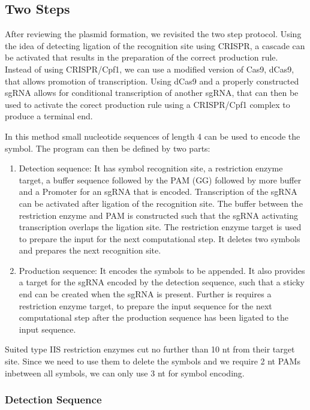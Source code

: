 \documentclass[
11pt, %
a4paper, %
oneside, %
headinclude,footinclude, %
BCOR5mm, %
]{scrartcl}
\begin{document}
\subsection{Two Steps}

After reviewing the plasmid formation, we revisited the two step protocol. Using
the idea of detecting ligation of the recognition site using CRISPR, a cascade
can be activated that results in the preparation of the correct production rule.
Instead of using CRISPR/Cpf1, we can use a modified version of Cas9, dCas9, that
allows promotion of transcription. Using dCas9 and a properly constructed sgRNA
allows for conditional transcription of another sgRNA, that can then be used to
activate the corect production rule using a CRISPR/Cpf1 complex to produce a
terminal end.

In this method small nucleotide sequences of length 4 can be used to encode the
symbol. The program can then be defined by two parts:
\begin{enumerate}
  \item Detection sequence: It has symbol recognition site, a restriction enzyme
    target, a buffer sequence followed by the PAM (GG) followed by more buffer
    and a Promoter for an sgRNA that is encoded. Transcription of the sgRNA can
    be activated after ligation of the recognition site. The buffer between the
    restriction enzyme and PAM is constructed such that the sgRNA activating
    transcription overlaps the ligation site. The restriction enzyme target is
    used to prepare the input for the next computational step. It deletes two
    symbols and prepares the next recognition site.
  \item Production sequence: It encodes the symbols to be appended. It also
    provides a target for the sgRNA encoded by the detection sequence, such that
    a sticky end can be created when the sgRNA is present. Further is requires a
    restriction enzyme target, to prepare the input sequence for the next
    computational step after the production sequence has been ligated to the
    input sequence.
\end{enumerate}
Suited type IIS restriction enzymes cut no further than 10 nt from their target site.
Since we need to use them to delete the symbols and we require 2 nt PAMs
inbetween all symbols, we can only use 3 nt for symbol encoding.

\subsubsection{Detection Sequence}
\end{document}
